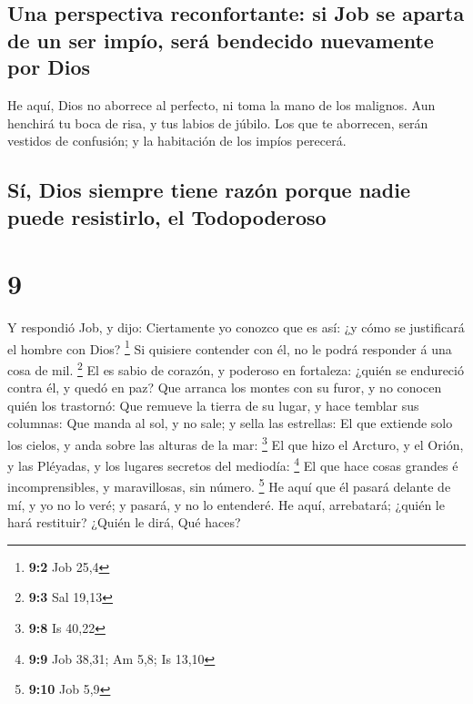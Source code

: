\hypertarget{una-perspectiva-reconfortante-si-job-se-aparta-de-un-ser-impuxedo-seruxe1-bendecido-nuevamente-por-dios}{%
\subsection{Una perspectiva reconfortante: si Job se aparta de un ser
impío, será bendecido nuevamente por
Dios}\label{una-perspectiva-reconfortante-si-job-se-aparta-de-un-ser-impuxedo-seruxe1-bendecido-nuevamente-por-dios}}

 He aquí, Dios no aborrece al perfecto, ni toma la mano de
los malignos.  Aun henchirá tu boca de risa, y tus labios
de júbilo.  Los que te aborrecen, serán vestidos de
confusión; y la habitación de los impíos perecerá.

\hypertarget{suxed-dios-siempre-tiene-razuxf3n-porque-nadie-puede-resistirlo-el-todopoderoso}{%
\subsection{Sí, Dios siempre tiene razón porque nadie puede resistirlo,
el
Todopoderoso}\label{suxed-dios-siempre-tiene-razuxf3n-porque-nadie-puede-resistirlo-el-todopoderoso}}

\hypertarget{section-8}{%
\section{9}\label{section-8}}

 Y respondió Job, y dijo:  Ciertamente yo
conozco que es así: ¿y cómo se justificará el hombre con Dios?
\footnote{\textbf{9:2} Job 25,4}  Si quisiere contender con
él, no le podrá responder á una cosa de mil. \footnote{\textbf{9:3} Sal
  19,13}  El es sabio de corazón, y poderoso en fortaleza:
¿quién se endureció contra él, y quedó en paz?  Que arranca
los montes con su furor, y no conocen quién los trastornó: 
Que remueve la tierra de su lugar, y hace temblar sus columnas:
 Que manda al sol, y no sale; y sella las estrellas:
 El que extiende solo los cielos, y anda sobre las alturas
de la mar: \footnote{\textbf{9:8} Is 40,22}  El que hizo el
Arcturo, y el Orión, y las Pléyadas, y los lugares secretos del
mediodía: \footnote{\textbf{9:9} Job 38,31; Am 5,8; Is 13,10}
 El que hace cosas grandes é incomprensibles, y
maravillosas, sin número. \footnote{\textbf{9:10} Job 5,9} 
He aquí que él pasará delante de mí, y yo no lo veré; y pasará, y no lo
entenderé.  He aquí, arrebatará; ¿quién le hará restituir?
¿Quién le dirá, Qué haces?

